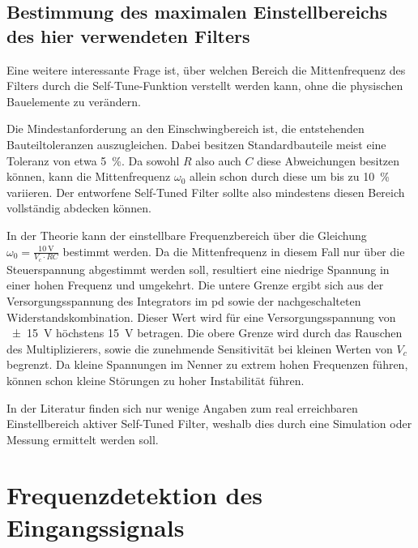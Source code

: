 \documentclass[../main.tex]{subfiles}
\begin{document}
\subsection{Bestimmung des maximalen Einstellbereichs des hier verwendeten Filters}
\label{sec:max_tune}

Eine weitere interessante Frage ist, über welchen Bereich die Mittenfrequenz des Filters durch die Self-Tune-Funktion verstellt werden kann, ohne die physischen Bauelemente zu verändern.\par
\medskip

Die Mindestanforderung an den Einschwingbereich ist, die entstehenden Bauteiltoleranzen auszugleichen. Dabei besitzen Standardbauteile meist eine Toleranz von etwa \SI{5}{\percent}. Da sowohl $R$ also auch $C$ diese Abweichungen besitzen können, kann die Mittenfrequenz $\omega_0$ allein schon durch diese um bis zu \SI{10}{\percent} variieren. Der entworfene Self-Tuned Filter sollte also mindestens diesen Bereich vollständig abdecken können. \par
\medskip

In der Theorie kann der einstellbare Frequenzbereich über die Gleichung $\omega_0=\frac{\SI{10}{\volt}}{V_c \cdot RC}$ bestimmt werden. Da die Mittenfrequenz in diesem Fall nur über die Steuerspannung abgestimmt werden soll, resultiert eine niedrige Spannung in einer hohen Frequenz und umgekehrt. Die untere Grenze ergibt sich aus der Versorgungsspannung des Integrators im \gls{pd} sowie der nachgeschalteten Widerstandskombination. Dieser Wert wird für eine Versorgungsspannung von \SI{\pm 15}{\volt} höchstens \SI{15}{\volt} betragen. Die obere Grenze wird durch das Rauschen des Multiplizierers, sowie die zunehmende Sensitivität bei kleinen Werten von $V_c$ begrenzt. Da kleine Spannungen im Nenner zu extrem hohen Frequenzen führen, können schon kleine Störungen zu hoher Instabilität führen.\par
\medskip
In der Literatur finden sich nur wenige Angaben zum real erreichbaren Einstellbereich aktiver Self-Tuned Filter, weshalb dies durch eine Simulation oder Messung ermittelt werden soll. \par







\section{Frequenzdetektion des Eingangssignals}
\end{document}
